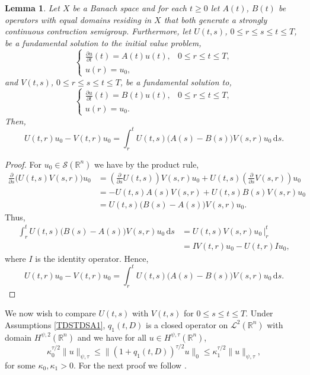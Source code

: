 \documentclass[a4paper, 12pt]{report}
\newtheorem{lemma}[theorem]{Lemma}
\theoremstyle{cor}
\theoremstyle{remark}
\theoremstyle{definition}
\begin{document}
\begin{lemma}\label{TDSTDSL1}
Let $X$ be a Banach space and for each $t \ge 0$ let $A(t)$, $B(t)$ be operators with equal domains residing in $X$ that both generate a strongly continuous contraction semigroup.  Furthermore, let $U(t, s)$, $0 \le r \le s \le t \le T$, be a fundamental solution to the initial value problem,
$$
\begin{cases}
\frac{\partial u}{\partial t}(t) = A(t)u(t), & 0 \le r \le t \le T,\\
u(r) = u_0,
\end{cases}
$$
and $V(t, s)$, $0 \le r \le s \le t \le T$, be a fundamental solution to,
$$
\begin{cases}
\frac{\partial u}{\partial t}(t) = B(t)u(t), & 0 \le r \le t \le T,\\
u(r) = u_0.
\end{cases}
$$
Then,
$$
U(t, r)u_0 - V(t, r)u_0 = \int_r^tU(t, s)\big(A(s) - B(s)\big)V(s, r)u_0\,\mathrm{d}s.
$$
\end{lemma}
\begin{proof}
For $u_0 \in \mathcal{S}(\mathbb{R}^n)$ we have by the product rule,
$$
\begin{aligned}
\frac{\partial}{\partial s}\big(U(t, s)V(s, r)\big)u_0 & = \left(\frac{\partial}{\partial s}U(t, s)\right)V(s, r)u_0 + U(t, s)\left(\frac{\partial}{\partial s}V(s, r)\right)u_0\\
& = -U(t, s)A(s)V(s, r) + U(t, s)B(s)V(s, r)u_0\\
& = U(t, s)\big(B(s) - A(s)\big)V(s, r)u_0.
\end{aligned}
$$
Thus,
$$
\begin{aligned}
\int_r^tU(t, s)\big(B(s) - A(s)\big)V(s, r)u_0\,\mathrm{d}s & = U(t, s)V(s, r)u_0\,\bigg|_r^t\\
& = IV(t, r)u_0 - U(t, r)Iu_0,
\end{aligned}
$$
where $I$ is the identity operator.  Hence,
$$
U(t, r)u_0 - V(t, r)u_0 = \int_r^tU(t, s)\big(A(s) - B(s)\big)V(s, r)u_0\,\mathrm{d}s.
$$
\end{proof}

We now wish to compare $U(t, s)$ with $V(t, s)$ for $0 \le s \le t \le T$.  Under Assumptions \ref{TDSTDSA1}, $q_1(t, D)$ is a closed operator on $\mathcal{L}^2(\mathbb{R}^n)$ with domain $H^{\psi, 2}(\mathbb{R}^n)$ and we have for all $u \in H^{\psi, \tau}(\mathbb{R}^n)$,
\begin{equation}
\kappa_0^{\tau/2}\|u\|_{\psi, \tau} \le \|(1 + q_1(t, D))^{\tau/2} u\|_0 \le \kappa_1^{\tau/2}\|u\|_{\psi, \tau},
\end{equation}
for some $\kappa_0, \kappa_1 > 0$.  For the next proof we follow \cite[Theorem 3.1]{EstimatesPaper}.
\end{document}
